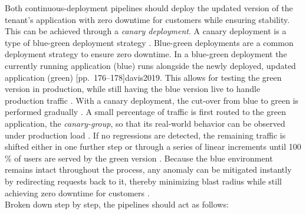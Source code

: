 \documentclass[11pt, a4paper, oneside, listof=totoc]{scrartcl}
\begin{document}
                    Both continuous-deployment pipelines should deploy the updated version of the
                    tenant's application with zero downtime for customers while ensuring stability.
                    This can be achieved through a \textit{canary deployment}.
                    A canary deployment is a type of blue-green deployment strategy
                    \parencite[pp.~33--34]{awsOverviewDeploymentOptions}.
                    Blue-green deployments are a common deployment strategy to ensure zero downtime.
                    In a blue-green deployment the currently running application (blue) runs
                    alongside the newly deployed, updated application (green)
                    \parencite[pp.~32--33]{awsOverviewDeploymentOptions}[pp.~176--178]{davis2019}.
                    This allows for testing the green version in production, while still having the
                    blue version live to handle production traffic
                    \parencite[pp.~176--178]{davis2019}.
                    With a canary deployment, the cut-over from blue to green is performed
                    gradually \parencite[pp.~33--34]{awsOverviewDeploymentOptions}.
                    A small percentage of traffic is first routed to the green application,
                    the \textit{canary-group}, so that its real-world behavior can be observed under
                    production load \parencite[pp.~33--34]{awsOverviewDeploymentOptions}.
                    If no regressions are detected, the remaining traffic is shifted either in one
                    further step or through a series of linear increments until 100 \% of users are
                    served by the green version
                    \parencite[pp.~33--34]{awsOverviewDeploymentOptions}.
                    Because the blue environment remains intact throughout the process, any anomaly
                    can be mitigated instantly by redirecting requests back to it, thereby
                    minimizing blast radius while still achieving zero downtime for customers
                    \parencite[pp.~33--34]{awsOverviewDeploymentOptions}.
                    \\
                    Broken down step by step, the pipelines should act as follows:
                    
\end{document}
